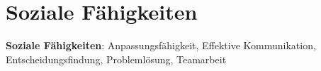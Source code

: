 \documentclass[letterpaper,11pt]{article}
\begin{document}
\section{Soziale Fähigkeiten}
\begin{itemize}[leftmargin=0.15in, label={}]
	\small{\item{
                        \textbf{Soziale Fähigkeiten}{: Anpassungsfähigkeit, Effektive Kommunikation, Entscheidungsfindung, Problemlösung, Teamarbeit} \\
		      }}
\end{itemize}
\end{document}
